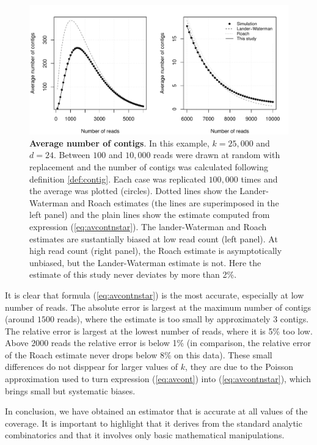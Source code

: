 \documentclass{article}
\begin{document}
\begin{figure}[h]
\centering
\includegraphics[scale=0.585]{Fig3.pdf}
\caption{\textbf{Average number of contigs}. In this example, $k=25,000$
and $d=24$. Between $100$ and $10,000$ reads were drawn at random with
replacement and the number of contigs was calculated following definition
\ref{def:contig}. Each case was replicated $100,000$ times and the average
was plotted (circles). Dotted lines show the Lander-Waterman and Roach
estimates (the lines are superimposed in the left panel) and the plain
lines show the estimate computed from expression (\ref{eq:avcontnstar}).
The lander-Waterman and Roach estimates are sustantially biased at low
read count (left panel). At high read count (right panel), the Roach
estimate is asymptotically unbiased, but the Lander-Waterman estimate is
not. Here the estimate of this study never deviates by more than 2\%.}
\label{fig:avcontig}
\end{figure}

It is clear that formula (\ref{eq:avcontnstar}) is the most accurate,
especially at low number of reads. The absolute error is largest at the
maximum number of contigs (around $1500$ reads), where the estimate is too
small by approximately $3$ contigs. The relative error is largest at the
lowest number of reads, where it is 5\% too low. Above $2000$ reads the
relative error is below 1\% (in comparison, the relative error of the
Roach estimate never drops below 8\% on this data). These small
differences do not disppear for larger values of $k$, they are due to the
Poisson approximation used to turn expression (\ref{eq:avcont}) into
(\ref{eq:avcontnstar}), which brings small but systematic biases.

In conclusion, we have obtained an estimator that is accurate at all
values of the coverage. It is important to highlight that it derives from
the standard analytic combinatorics and that it involves only basic
mathematical manipulations.
\end{document}
